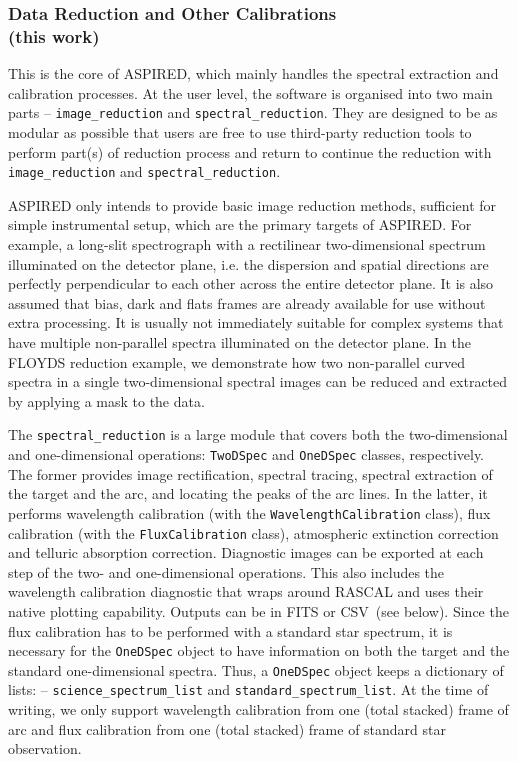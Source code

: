 \documentclass[linenumbers, twocolumn]{aastex631}
\begin{document}
\subsubsection*{Data Reduction and Other Calibrations\\(this work)}
This is the core of \textsc{ASPIRED}, which mainly handles the spectral
extraction and calibration processes. At the user level, the software is
organised into two main parts -- \texttt{image\_reduction} and
\texttt{spectral\_reduction}. They are designed to be as modular as possible
that users are free to use third-party reduction tools to perform part(s) of 
reduction process and return to continue the reduction with
\texttt{image\_reduction} and \texttt{spectral\_reduction}.

\textsc{ASPIRED} only intends to provide basic image reduction methods,
sufficient for simple instrumental setup, which are the primary targets of
\textsc{ASPIRED}. For example, a long-slit spectrograph with a rectilinear
two-dimensional spectrum illuminated on the detector plane, i.e. the dispersion
and spatial directions are perfectly perpendicular to each other across the
entire detector plane. It is also assumed that bias, dark and flats frames
are already available for use without extra processing. It is usually not
immediately suitable for complex systems that have multiple non-parallel
spectra illuminated on the detector plane. In the FLOYDS reduction example,
we demonstrate how two non-parallel curved spectra in a single two-dimensional
spectral images can be reduced and extracted by applying a mask to the data.

The \texttt{spectral\_reduction} is a large module that covers both the
two-dimensional and one-dimensional operations: \texttt{TwoDSpec} and
\texttt{OneDSpec} classes, respectively. The former provides image
rectification, spectral tracing, spectral extraction of the target and the
arc, and locating the peaks of the arc lines. In the latter, it performs
wavelength calibration (with the \texttt{WavelengthCalibration} class),
flux calibration (with the \texttt{FluxCalibration} class), atmospheric
extinction correction and telluric absorption correction. Diagnostic images
can be exported at each step of the two- and one-dimensional operations.
This also includes the wavelength calibration diagnostic that wraps around
\textsc{RASCAL} and uses their native plotting capability. Outputs can be
in FITS or CSV~(see below). Since the flux calibration has to be performed
with a standard star spectrum, it is necessary for the \texttt{OneDSpec}
object to have information on both the target and the standard one-dimensional
spectra. Thus, a \texttt{OneDSpec} object keeps a dictionary of lists: --
\texttt{science\_spectrum\_list} and \texttt{standard\_spectrum\_list}. At the
time of writing, we only support wavelength calibration from one (total
stacked) frame of arc and flux calibration from one (total stacked) frame
of standard star observation.
\end{document}
